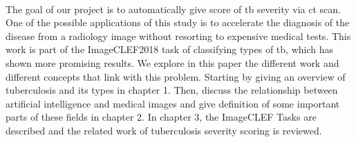 \paragraph{}
The goal of our project is to automatically give score of \ac{tb} severity via \ac{ct} scan. One of the possible applications of this study is to accelerate the diagnosis of the disease from a radiology image without resorting to expensive medical tests. This work is part of the ImageCLEF2018  task of classifying types of \ac{tb}, which has shown more promising results. We explore in this paper the different work and different concepts that link with this problem. Starting by giving an overview of tuberculosis and its types in chapter 1. Then, discuss the relationship between artificial intelligence and medical images and give definition of some important parts of these fields in chapter 2. In chapter 3, the ImageCLEF Tasks are described and the related work of tuberculosis severity scoring is reviewed.